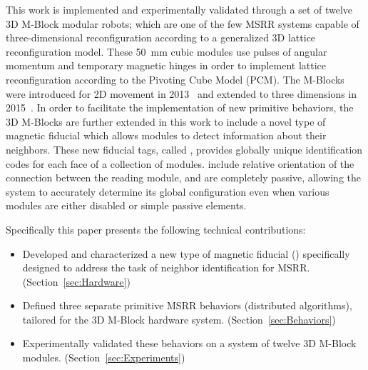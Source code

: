 This work is implemented and experimentally validated through a set of twelve 3D M-Block modular robots; which are one of the few MSRR systems capable of three-dimensional reconfiguration according to a generalized 3D lattice reconfiguration model. These 50~mm cubic modules use pulses of angular momentum and temporary magnetic hinges in order to implement lattice reconfiguration according to the Pivoting Cube Model (PCM). The M-Blocks were introduced for 2D movement in 2013~\cite{RomanishinRus-IROS13} and extended to three dimensions in 2015~\cite{Romanishin20153d}. In order to facilitate the implementation of new primitive behaviors, the 3D M-Blocks are further extended in this work to include a novel type of magnetic fiducial which allows modules to detect information about their neighbors. These new fiducial tags, called \tagNamePlural, provides globally unique identification codes for each face of a collection of modules. \TagNamePlural include relative orientation of the connection between the reading module, and are completely passive, allowing the system to accurately determine its global configuration even when various modules are either disabled or simple passive elements.

Specifically this paper presents the following technical contributions:
\begin{itemize}
	\item Developed and characterized a new type of magnetic fiducial (\TagNamePlural) specifically designed to address the task of neighbor identification for MSRR. (Section~\ref{sec:Hardware})
	\item Defined three separate primitive MSRR behaviors (distributed algorithms), tailored for the 3D M-Block hardware system. (Section~\ref{sec:Behaviors})
	\item Experimentally validated these behaviors on a system of twelve 3D M-Block modules. (Section~\ref{sec:Experiments})
\end{itemize}




